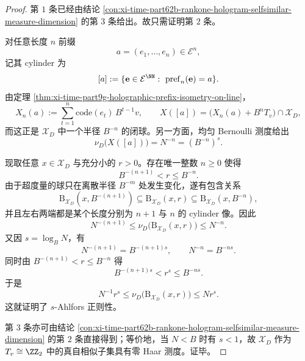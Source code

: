 \begin{proof}
第 \(1\) 条已经由结论 \ref{con:xi-time-part62b-rankone-hologram-selfsimilar-measure-dimension} 的第 \(3\) 条给出。故只需证明第 \(2\) 条。

对任意长度 \(n\) 前缀
\[
a=(e_1,\dots,e_n)\in\mathcal E^n,
\]
记其 cylinder 为
\[
[a]:=\{\mathbf e\in\mathcal E^{\NN}:\ \mathrm{pref}_n(\mathbf e)=a\}.
\]
由定理 \ref{thm:xi-time-part9g-holographic-prefix-isometry-on-line}，
\[
X_n(a):=\sum_{t=1}^{n}\mathrm{code}(e_t)\,B^{t-1}v,
\qquad
X([a])=\bigl(X_n(a)+B^nT_v\bigr)\cap \mathcal X_D,
\]
而这正是 \(\mathcal X_D\) 中一个半径 \(B^{-n}\) 的闭球。另一方面，均匀 Bernoulli 测度给出
\[
\nu_D\bigl(X([a])\bigr)=N^{-n}=(B^{-n})^s.
\]

现取任意 \(x\in\mathcal X_D\) 与充分小的 \(r>0\)。存在唯一整数 \(n\ge 0\) 使得
\[
B^{-(n+1)}<r\le B^{-n}.
\]
由于超度量的球只在离散半径 \(B^{-m}\) 处发生变化，遂有包含关系
\[
\mathrm B_{\mathcal X_D}(x,B^{-(n+1)})
\subseteq
\mathrm B_{\mathcal X_D}(x,r)
\subseteq
\mathrm B_{\mathcal X_D}(x,B^{-n}),
\]
并且左右两端都是某个长度分别为 \(n+1\) 与 \(n\) 的 cylinder 像。因此
\[
N^{-(n+1)}
\le
\nu_D\bigl(\mathrm B_{\mathcal X_D}(x,r)\bigr)
\le
N^{-n}.
\]
又因 \(s=\log_B N\)，有
\[
N^{-(n+1)}=B^{-(n+1)s},
\qquad
N^{-n}=B^{-ns}.
\]
同时由 \(B^{-(n+1)}<r\le B^{-n}\) 得
\[
B^{-(n+1)s}<r^s\le B^{-ns}.
\]
于是
\[
N^{-1}r^s\le \nu_D\bigl(\mathrm B_{\mathcal X_D}(x,r)\bigr)\le Nr^s.
\]
这就证明了 \(s\)-Ahlfors 正则性。

第 \(3\) 条亦可由结论 \ref{con:xi-time-part62b-rankone-hologram-selfsimilar-measure-dimension} 的第 \(2\) 条直接得到；等价地，当 \(N<B\) 时有 \(s<1\)，故 \(\mathcal X_D\) 作为 \(T_v\cong\ZZ_2\) 中的真自相似子集具有零 Haar 测度。证毕。
\end{proof}

